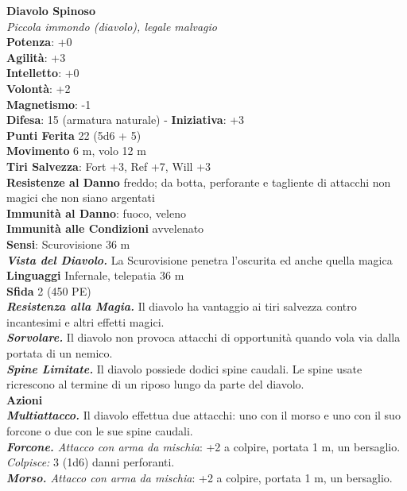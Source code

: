 \begin{multicols}{2}
\medskip\textbf{Diavolo Spinoso}\\
\emph{Piccola immondo (diavolo), legale malvagio}\\
\textbf{Potenza}: +0\\
\textbf{Agilità}: +3\\
\textbf{Intelletto}: +0\\
\textbf{Volontà}: +2\\
\textbf{Magnetismo}: -1\\
\textbf{Difesa}: 15 (armatura naturale) - \textbf{Iniziativa}: +3\\
\textbf{Punti Ferita} 22 (5d6 + 5)\\
\textbf{Movimento} 6 m, volo 12 m\\
\textbf{Tiri Salvezza}: Fort +3, Ref +7, Will +3\\
\textbf{Resistenze al Danno} freddo; da botta, perforante e tagliente di attacchi non magici che non siano argentati\\
\textbf{Immunità al Danno}: fuoco, veleno \\
\textbf{Immunità alle Condizioni} avvelenato\\
\textbf{Sensi}: Scurovisione 36 m\\
\emph{\textbf{Vista del Diavolo.}} La Scurovisione penetra l'oscurita ed anche quella magica\\
\textbf{Linguaggi} Infernale, telepatia 36 m \\
\textbf{Sfida} 2 (450 PE)\smallskip\\
\emph{\textbf{Resistenza alla Magia.}} Il diavolo ha vantaggio ai tiri salvezza contro incantesimi e altri effetti magici.\\
\emph{\textbf{Sorvolare.}} Il diavolo non provoca attacchi di opportunità quando vola via dalla portata di un nemico.\\
\emph{\textbf{Spine Limitate.}} Il diavolo possiede dodici spine caudali. Le spine usate ricrescono al termine di un riposo lungo da parte del diavolo.\\
\smallskip\textbf{Azioni}\\
\emph{\textbf{Multiattacco.}} Il diavolo effettua due attacchi: uno con il morso e uno con il suo forcone o due con le sue spine caudali.\\
\emph{\textbf{Forcone.} Attacco con arma da mischia}: +2 a colpire, portata 1 m, un bersaglio.\\
\emph{Colpisce:} 3 (1d6) danni perforanti. \\
\emph{\textbf{Morso.} Attacco con arma da mischia}: +2 a colpire, portata 1 m, un bersaglio.\\

\end{multicols}
